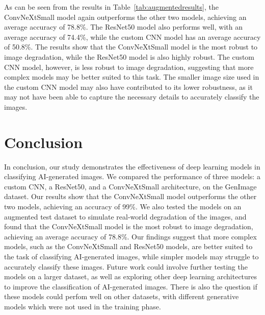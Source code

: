 \documentclass[runningheads]{llncs}
\begin{document}
As can be seen from the results in Table~\ref{tab:augmentedresults}, the ConvNeXtSmall model again outperforms the other two models, achieving an average accuracy of 78.8\%. The ResNet50 model also performs well, with an average accuracy of 74.4\%, while the custom CNN model has an average accuracy of 50.8\%. The results show that the ConvNeXtSmall model is the most robust to image degradation, while the ResNet50 model is also highly robust. The custom CNN model, however, is less robust to image degradation, suggesting that more complex models may be better suited to this task. The smaller image size used in the custom CNN model may also have contributed to its lower robustness, as it may not have been able to capture the necessary details to accurately classify the images.
%
%
\section{Conclusion}

In conclusion, our study demonstrates the effectiveness of deep learning models in classifying AI-generated images. We compared the performance of three models: a custom CNN, a ResNet50, and a ConvNeXtSmall architecture, on the GenImage dataset. Our results show that the ConvNeXtSmall model outperforms the other two models, achieving an accuracy of 99\%. We also tested the models on an augmented test dataset to simulate real-world degradation of the images, and found that the ConvNeXtSmall model is the most robust to image degradation, achieving an average accuracy of 78.8\%. Our findings suggest that more complex models, such as the ConvNeXtSmall and ResNet50 models, are better suited to the task of classifying AI-generated images, while simpler models may struggle to accurately classify these images. Future work could involve further testing the models on a larger dataset, as well as exploring other deep learning architectures to improve the classification of AI-generated images. There is also the question if these models could perfom well on other datasets, with different generative models which were not used in the training phase.
%
%
%


\end{document}
